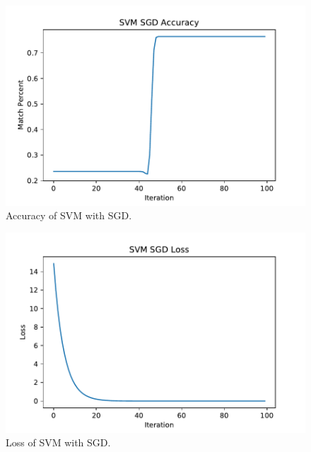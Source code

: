 \documentclass[journal, a4paper]{IEEEtran}
\begin{document}
	\begin{figure}[!hbt]
		\begin{center}
		\includegraphics[width=\columnwidth]{lab2_svm_sgd_acc}
		\caption{Accuracy of SVM with SGD.}
		\end{center}
	\end{figure}
	\begin{figure}[!hbt]
		\begin{center}
		\includegraphics[width=\columnwidth]{lab2_svm_sgd_loss}
		\caption{Loss of SVM with SGD.}
		\end{center}
	\end{figure}
	
\end{document}
